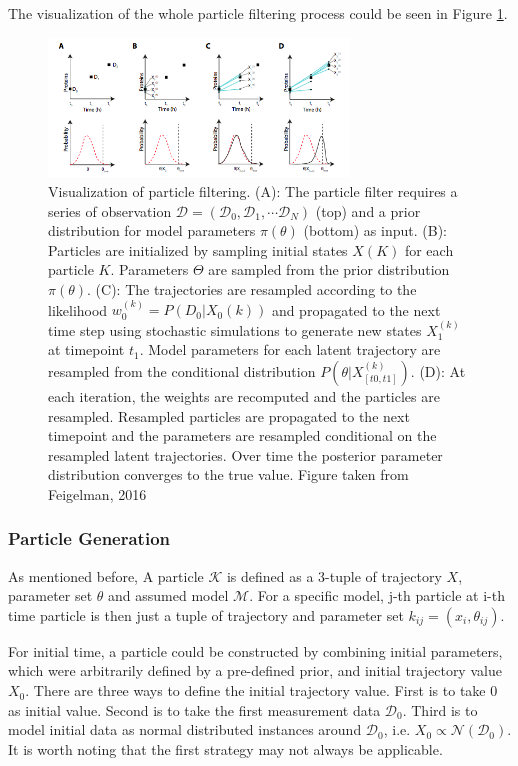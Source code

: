 \documentclass{bioinfo}
\begin{document}
The visualization of the whole particle filtering process could be seen in Figure \ref{fig:03}.

\begin{figure}[h]
\includegraphics[width=8cm]{figures/particle_filtering.png}
\caption{Visualization of particle filtering. (A): The particle filter requires a series of observation $\mathcal{D} = (\mathcal{D}_0, \mathcal{D}_1, \cdots \mathcal{D}_N)$ (top) and a prior distribution for model parameters $\pi(\theta)$ (bottom) as input. (B): Particles are initialized by sampling initial states $X(K)$ for each particle $K$. Parameters $\Theta$ are sampled from the prior distribution $\pi(\theta)$. (C): The trajectories are resampled according to the likelihood $w_0^{(k)} = P(D_0|X_0(k))$ and propagated to the next time step using stochastic simulations to generate new states $X_1^{(k)}$ at timepoint $t_1$. Model parameters for each latent trajectory are resampled from the conditional distribution $P(\theta|X^{(k)}_{[t0,t1]})$. (D): At each iteration, the weights are recomputed and the particles are resampled. Resampled particles are propagated to the next timepoint and the parameters are resampled conditional on the resampled latent trajectories. Over time the posterior parameter distribution converges to the true value. Figure taken from Feigelman, 2016 \citealp{Feigelman16}}  \label{fig:03}
\end{figure}

\vspace*{-6pt}

\subsubsection{Particle Generation}

As mentioned before, A particle $\mathcal{K}$ is defined as a 3-tuple of trajectory $X$, parameter set $\theta$ and assumed model $\mathcal{M}$. For a specific model, j-th particle at i-th time particle is then just a tuple of trajectory and parameter set $k_{ij} = (x_i, \theta_{ij})$.

For initial time, a particle could be constructed by combining initial parameters, which were arbitrarily defined by a pre-defined prior, and initial trajectory value $X_0$. There are three ways to define the initial trajectory value. First is to take 0 as initial value. Second is to take the first measurement data $\mathcal{D}_0$. Third is to model initial data as normal distributed instances around $\mathcal{D}_0$, i.e. $X_0 \propto \mathcal{N}(\mathcal{D}_0)$. It is worth noting that the first strategy may not always be applicable.
\end{document}
